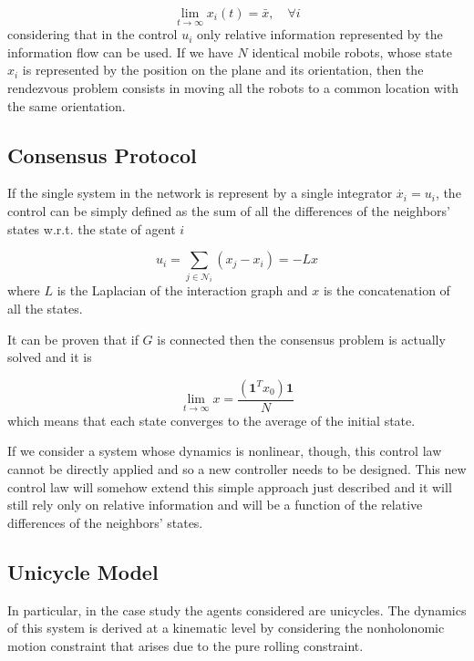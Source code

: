 \documentclass[11pt]{article}
\begin{document}
\begin{equation}
\lim_{t\rightarrow\infty}x_i(t) = \bar{x}, \quad \forall i
\end{equation}
considering that in the control $u_i$ only relative information represented by the information flow can be used.
If we have $N$ identical mobile robots, whose state $x_i$ is represented by the position on the plane and its orientation, then the rendezvous problem consists in moving all the robots to a common location with the same orientation.

\subsection*{Consensus Protocol}

If the single system in the network is represent by a single integrator $\dot{x_i} = u_i$, the control can be simply defined as the sum of all the differences of the neighbors' states w.r.t. the state of agent $i$

\begin{equation}
u_i = \sum_{j \in \mathcal{N}_i}(x_j - x_i) = -Lx
\end{equation}
where $L$ is the Laplacian of the interaction graph and $x$ is the concatenation of all the states.

It can be proven that if $G$ is connected then the consensus problem is actually solved and it is

\begin{equation}
\lim_{t\rightarrow\infty} x = \frac{(\mathbf{1}^Tx_0)\mathbf{1}}{N}
\end{equation}
which means that each state converges to the average of the initial state.

If we consider a system whose dynamics is nonlinear, though, this control law cannot be directly applied and so a new controller needs to be designed. This new control law will somehow extend this simple approach just described and it will still rely only on relative information and will be a function of the relative differences of the neighbors' states.

\subsection*{Unicycle Model}

In particular, in the case study the agents considered are unicycles. The dynamics of this system is derived at a kinematic level by considering the nonholonomic motion constraint that arises due to the pure rolling constraint.
\end{document}
